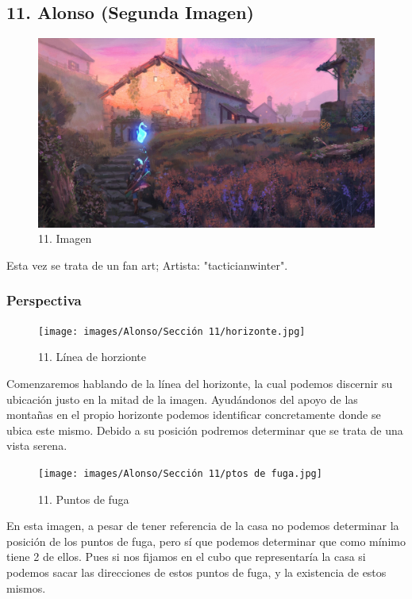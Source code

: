\documentclass[12pt]{article}
\begin{document}
        \newpage


    \subsection{11. Alonso (Segunda Imagen)}
    \begin{figure}[H]
      \centering
      \includegraphics[width=\textwidth]{images/Concepts/11_concept_art.jpg}
      \caption{\small 11. Imagen}
    \end{figure}
    Esta vez se trata de un fan art; Artista: "tacticianwinter".

        \subsubsection{Perspectiva}
        \begin{figure}[H]
      \centering
      \texttt{[image: images/Alonso/Sección 11/horizonte.jpg]}
      \caption{\small 11. Línea de horzionte}
    \end{figure}
    Comenzaremos hablando de la línea del horizonte, la cual podemos discernir su ubicación justo en la mitad de la imagen. Ayudándonos del apoyo de las montañas en el propio horizonte podemos identificar concretamente donde se ubica este mismo. Debido a su posición podremos determinar que se trata de una vista serena.

    \begin{figure}[H]
      \centering
      \texttt{[image: images/Alonso/Sección 11/ptos de fuga.jpg]}
      \caption{\small 11. Puntos de fuga}
    \end{figure}
    En esta imagen, a pesar de tener referencia de la casa no podemos determinar la posición de los puntos de fuga, pero sí que podemos determinar que como mínimo tiene 2 de ellos. Pues si nos fijamos en el cubo que representaría la casa si podemos sacar las direcciones de estos puntos de fuga, y la existencia de estos mismos.
\end{document}

